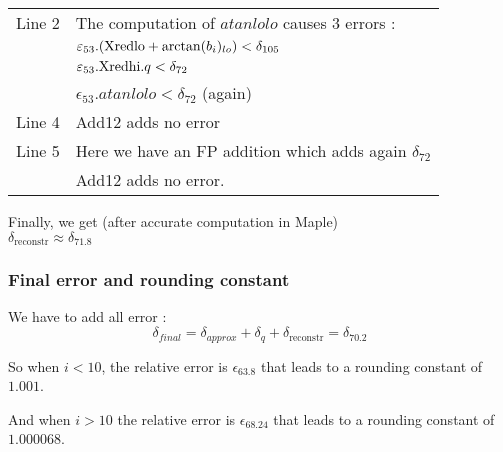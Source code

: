 \begin{center}
 \small
 \setlength{\unitlength}{3ex}
  \end{center}
\begin{tabular}{ll}
Line 2 & The computation of  $atanlolo$  causes 3 errors :\\
      & $ \varepsilon_{53}.({\mathrm{Xredlo}}+ \arctan(b_i)_{lo}) < \delta_{105}$\\
      & $\varepsilon_{53}.{\mathrm{Xredhi}}.q < \delta_{72}$\\
      & $\epsilon_{53} . atanlolo < \delta_{72}$ (again) \\
Line 4 & Add12 adds no error\\
Line 5 & Here we have an FP addition which adds again $\delta_{72}$\\
      & Add12 adds no error.
\end{tabular}      

Finally, we get (after  accurate computation in Maple) \\
$ \delta_\mathrm{reconstr} \approx \delta_{71.8}$



\subsubsection {Final error and rounding constant}

We have to add all error : 
\begin{equation}
\delta_{final} =  \delta_{approx} + \delta_{q}  + \delta_\mathrm{reconstr} = \delta_{70.2}
\end{equation}

So when $i < 10$, the relative error is $\epsilon_{63.8}$ that leads to a
rounding constant of $1.001$.

And when $i > 10$ the relative error is $\epsilon_{68.24}$ that leads to a
rounding constant of $1.000068$.

